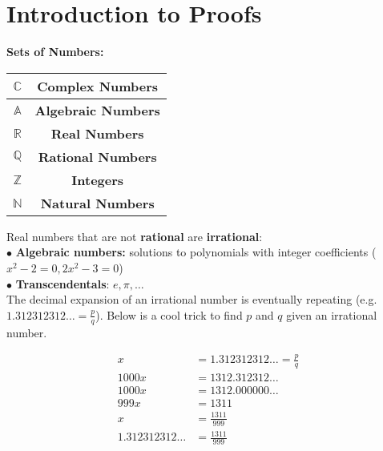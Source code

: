 \section{Introduction to Proofs}

    \textbf{Sets of Numbers:}

    \begin{center}
        \begin{tabular}{|c|c|}
            \hline
            $\mathbb{C}$        & \textbf{Complex Numbers} \\
            \hline
            $\mathbb{A}$ & \textbf{Algebraic Numbers} \\
            \hline
            $\mathbb{R}$ & \textbf{Real Numbers} \\
            \hline
            $\mathbb{Q}$ & \textbf{Rational Numbers} \\
            \hline
            $\mathbb{Z}$ & \textbf{Integers} \\
            \hline
            $\mathbb{N}$       & \textbf{Natural Numbers} \\
            \hline
        \end{tabular}
    \end{center}

    \noindent Real numbers that are not \textbf{rational} are \textbf{irrational}: \\
    $\bullet$ \textbf{Algebraic numbers:} solutions to polynomials with integer coefficients ($x^2 - 2 = 0, 2x^2 - 3 = 0$) \\
    $\bullet$ \textbf{Transcendentals}: $e,\pi,\dots$ \\

    \noindent The decimal expansion of an irrational number is eventually repeating \Big(e.g. $1.312312312\dots = \frac{p}{q}$\Big). Below is a cool trick to find $p$ and $q$ given an irrational number.

    \begin{align*}
        x   &= 1.312312312\dots = \frac{p}{q} \\
        1000x &= 1312.312312\dots \\
        1000x &= 1312.000000\dots \\
        999x  &= 1311 \\
        x     &= \frac{1311}{999} \\
        1.312312312\dots &= \frac{1311}{999}
    \end{align*}


